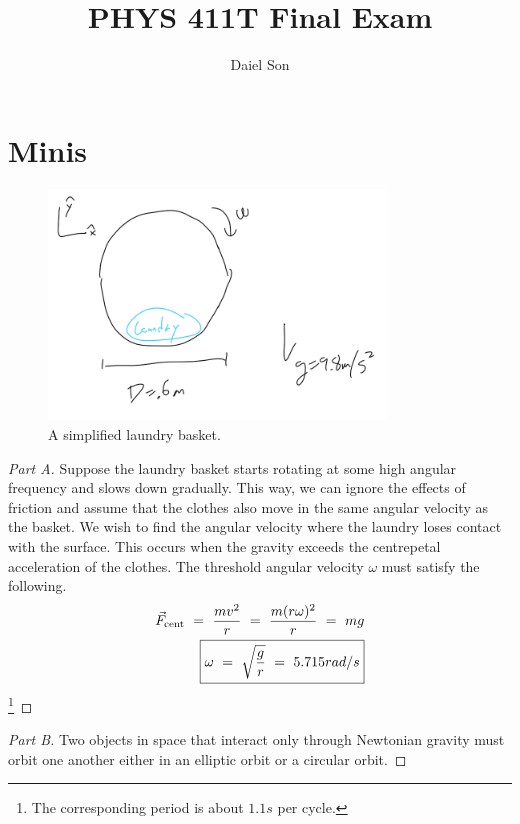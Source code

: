 \documentclass{article}
\title{PHYS 411T Final Exam}
\author{Daiel Son}
\numberwithin{equation}{section}
\begin{document}
\maketitle

\section{Minis}

\begin{figure}[htp]
    \centering
    \includegraphics[width=0.8\textwidth]{Q1_Fig.png} %
    \caption{A simplified laundry basket. }
    \label{fig:example}
\end{figure}

\begin{proof}[Part A]
    Suppose the laundry basket starts rotating at some high 
    angular frequency and slows down gradually. 
    This way, we can ignore the effects of friction 
    and assume that the clothes also move 
    in the same angular velocity as the basket. 
    We wish to find the angular velocity 
    where the laundry loses contact with the surface. 
    This occurs when the gravity exceeds 
    the centrepetal acceleration of the clothes. 
    The threshold angular velocity $\omega$ 
    must satisfy the following. 
\begin{align}
    \vec F_{\rm cent} \ = \ \frac {m v^2} r \ = \ \frac{m (r\omega)^2} r \ = \ mg \\ 
    \boxed{
        \omega \ = \ \sqrt{\frac g r  } \ = \ 5.715 rad/s
    }
\end{align}\footnote{The corresponding period is about $1.1s$ per cycle. }
    
\end{proof}

\begin{proof}[Part B]
    Two objects in space that 
    interact only through Newtonian gravity 
    must orbit one another either in an elliptic orbit or a circular orbit. 
    
\end{proof}
\end{document}
